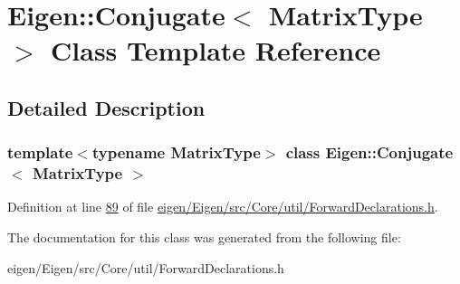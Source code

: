 \hypertarget{class_eigen_1_1_conjugate}{}\section{Eigen\+:\+:Conjugate$<$ Matrix\+Type $>$ Class Template Reference}
\label{class_eigen_1_1_conjugate}


\subsection{Detailed Description}
\subsubsection*{template$<$typename Matrix\+Type$>$\newline
class Eigen\+::\+Conjugate$<$ Matrix\+Type $>$}



Definition at line \hyperlink{eigen_2_eigen_2src_2_core_2util_2_forward_declarations_8h_source_l00089}{89} of file \hyperlink{eigen_2_eigen_2src_2_core_2util_2_forward_declarations_8h_source}{eigen/\+Eigen/src/\+Core/util/\+Forward\+Declarations.\+h}.



The documentation for this class was generated from the following file\+:\begin{DoxyCompactItemize}
\item 
eigen/\+Eigen/src/\+Core/util/\+Forward\+Declarations.\+h\end{DoxyCompactItemize}
